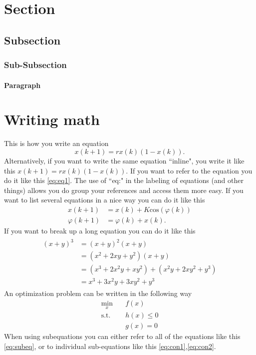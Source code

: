 \documentclass[11pt]{article}
\begin{document}
\section{Section}

\subsection{Subsection}
\subsubsection{Sub-Subsection}
\paragraph{Paragraph}

\section{Writing math}
This is how you write an equation
\begin{equation}\label{eq:eq1}
x(k+1) = rx(k)(1-x(k)).
\end{equation}
Alternatively, if you want to write the same equation ``inline", you write it like this $x(k+1) = rx(k)(1-x(k))$.
If you want to refer to the equation you do it like this \eqref{eq:eq1}. The use of ``eq:" in the labeling of equations (and other things) allows you do group your references and access them more easy.
If you want to list several equations in a nice way you can do it like this
\begin{align}
x(k+1) 	     & = x(k) + K \text{cos}(\varphi(k)) \\
\varphi(k+1) & = \varphi(k) + x(k).
\end{align}
If you want to break up a long equation you can do it like this
\begin{align}
\begin{split}
(x+y)^3 	&= (x+y)^2(x+y)\\
&=(x^2+2xy+y^2)(x+y)\\
&=(x^3+2x^2y+xy^2) + (x^2y+2xy^2+y^3)\\
&=x^3+3x^2y+3xy^2+y^3
\end{split}
\end{align}
An optimization problem can be written in the following way
\begin{subequations}\label{eq:subeq}
\begin{align}
\underset{x}{\min}	&\quad f(x) \\
\text{s.t.}				&\quad h(x) \leq 0 \label{eq:con1}\\
								&\quad g(x) = 0 \label{eq:con2}
\end{align}
\end{subequations}
When using subequations you can either refer to all of the equations like this \eqref{eq:subeq}, or to individual sub-equations like this \eqref{eq:con1},\eqref{eq:con2}.
\end{document}
